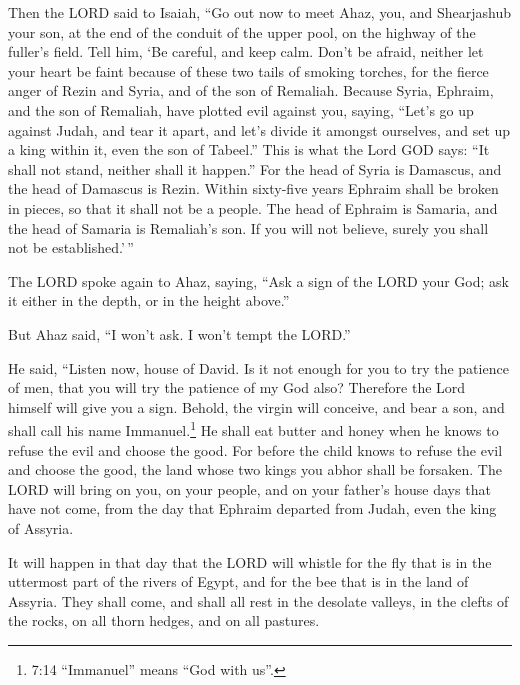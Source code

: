  Then the LORD said to Isaiah, ``Go out now to meet Ahaz,
you, and Shearjashub your son, at the end of the conduit of the upper
pool, on the highway of the fuller's field.  Tell him, `Be
careful, and keep calm. Don't be afraid, neither let your heart be faint
because of these two tails of smoking torches, for the fierce anger of
Rezin and Syria, and of the son of Remaliah.  Because Syria,
Ephraim, and the son of Remaliah, have plotted evil against you, saying,
 ``Let's go up against Judah, and tear it apart, and let's
divide it amongst ourselves, and set up a king within it, even the son
of Tabeel.''  This is what the Lord GOD says: ``It shall not
stand, neither shall it happen.''  For the head of Syria is
Damascus, and the head of Damascus is Rezin. Within sixty-five years
Ephraim shall be broken in pieces, so that it shall not be a people.
 The head of Ephraim is Samaria, and the head of Samaria is
Remaliah's son. If you will not believe, surely you shall not be
established.'\,''

 The LORD spoke again to Ahaz, saying,  ``Ask
a sign of the LORD your God; ask it either in the depth, or in the
height above.''

 But Ahaz said, ``I won't ask. I won't tempt the LORD.''

 He said, ``Listen now, house of David. Is it not enough
for you to try the patience of men, that you will try the patience of my
God also?  Therefore the Lord himself will give you a sign.
Behold, the virgin will conceive, and bear a son, and shall call his
name Immanuel.\footnote{7:14 ``Immanuel'' means ``God with us''.}
 He shall eat butter and honey when he knows to refuse the
evil and choose the good.  For before the child knows to
refuse the evil and choose the good, the land whose two kings you abhor
shall be forsaken.  The LORD will bring on you, on your
people, and on your father's house days that have not come, from the day
that Ephraim departed from Judah, even the king of Assyria.

 It will happen in that day that the LORD will whistle for
the fly that is in the uttermost part of the rivers of Egypt, and for
the bee that is in the land of Assyria.  They shall come,
and shall all rest in the desolate valleys, in the clefts of the rocks,
on all thorn hedges, and on all pastures.

